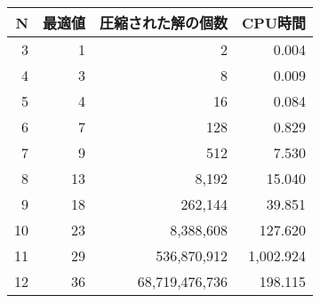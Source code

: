 \begin{table}[t]\scriptsize
\begin{tabular}{r|r|r|r}
 \hline
 N& 最適値& 圧縮された解の個数& CPU時間 \\
 \hline
 3&	1&	2&	0.004 \\
 4&	3&	8&	0.009 \\
 5&	4&	16&	0.084 \\
 6&	7&	128&	0.829 \\
 7&	9&	512&	7.530 \\
 8&	13&	8,192&	15.040 \\
 9&	18&	262,144&	39.851 \\
 10&	23&	8,388,608&	127.620 \\
 11&	29&	536,870,912&	1,002.924 \\
 12&	36&	68,719,476,736&	198.115 \\
\end{tabular}
\end{table}
